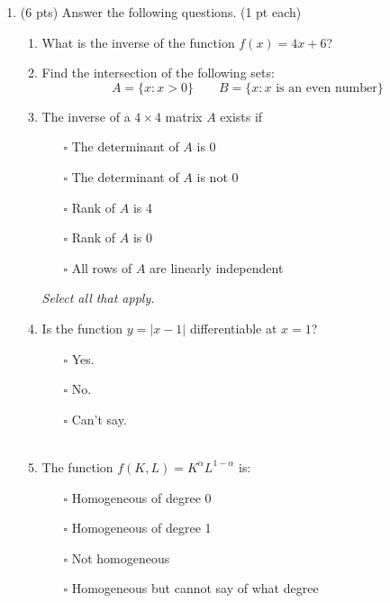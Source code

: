 \documentclass{./../../Latex/tests}
\begin{document}
\thispagestyle{plain}
\vspace{0.5em}

\newpage
\begin{enumerate}
\item (6 pts) Answer the following questions. (1 pt each)
\begin{enumerate}
\item What is the inverse of the function $f(x)= 4x + 6$? \\
\vspace{4cm}
\item  Find the intersection of the following sets:
$$ A = \{x: x>0 \} \quad \quad B = \{x: x\text{ is an even number} \} $$ 
\vspace{4cm}
\item  The inverse of a $4\times 4$ matrix $A$ exists if
\begin{itemize}
	\item[$\square$] The determinant of $A$ is 0 
	\item[$\square$] The determinant of $A$ is not 0 
	\item[$\square$] Rank of $A$ is 4
	\item[$\square$] Rank of $A$ is 0
	\item[$\square$] All rows of $A$ are linearly independent
\end{itemize}  
\textit{Select all that apply.}

\newpage
\item  Is the function $y=|x-1|$ differentiable at $x=1$? 
\begin{itemize}
	\item[$\square$] Yes. 
	\item[$\square$] No.
	\item[$\square$] Can't say. \\~\\
\end{itemize}  

\item The function $f(K,L) = K^{\alpha} L^{1-\alpha}$ is:
\begin{itemize}
  \item[$\square$] Homogeneous of degree 0
  \item[$\square$] Homogeneous of degree 1
  \item[$\square$] Not homogeneous 
  \item[$\square$] Homogeneous but cannot say of what degree \\~\\
\end{itemize}


\end{enumerate}
\end{enumerate}
\end{document}
